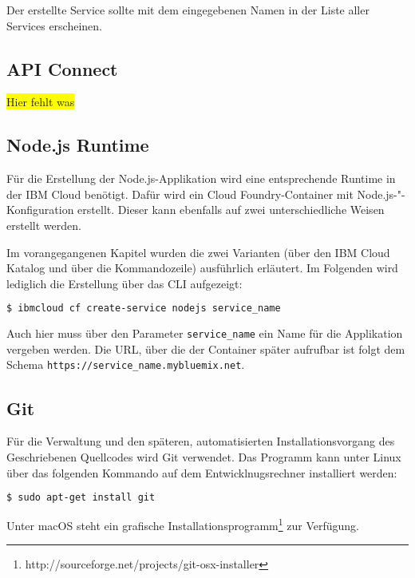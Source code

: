 Der erstellte Service sollte mit dem eingegebenen Namen in der Liste aller Services erscheinen.

\subsection{API Connect}
\label{subsec:apiconnect}
\colorbox{yellow}{Hier fehlt was}

\subsection{Node.js Runtime}
\label{ssc:nodejs_runtime}
Für die Erstellung der Node.js-Applikation wird eine entsprechende Runtime in der IBM Cloud benötigt. Dafür wird ein
Cloud Foundry-Container mit Node.js-"-Konfiguration erstellt. Dieser kann ebenfalls auf zwei unterschiedliche Weisen erstellt
werden.

Im vorangegangenen Kapitel wurden die zwei Varianten (über den IBM Cloud Katalog und über die Kommandozeile) ausführlich
erläutert. Im Folgenden wird lediglich die Erstellung über das CLI aufgezeigt:

\begin{lstlisting}[language=bash, caption=Instanziierung der Node.js Runtime, label=Instanziierung der Node.JS Runtime]
    $ ibmcloud cf create-service nodejs service_name
\end{lstlisting}

Auch hier muss über den Parameter \texttt{service\_name} ein Name für die Applikation vergeben werden. Die URL, über die
der Container später aufrufbar ist folgt dem Schema \texttt{https://service\_name.mybluemix.net}.

\subsection{Git}
Für die Verwaltung und den späteren, automatisierten Installationsvorgang des Geschriebenen Quellcodes wird Git verwendet.
Das Programm kann unter Linux über das folgenden Kommando auf dem Entwicklnugsrechner installiert werden:

\begin{lstlisting}[language=bash, caption=Installation von Git, label=Installation von Git]
    $ sudo apt-get install git
\end{lstlisting}

Unter macOS steht ein grafische Installationsprogramm\footnote{http://sourceforge.net/projects/git-osx-installer} zur
Verfügung.

